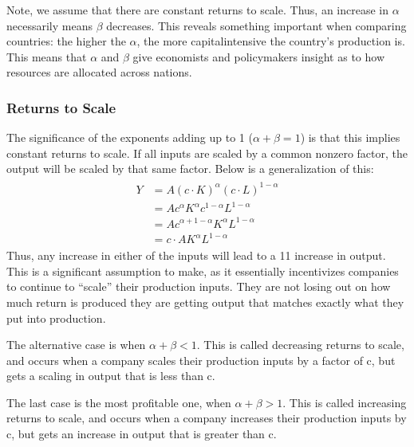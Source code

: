 \documentclass[letterpaper,10pt,english]{jupyterBook}
\begin{document}
\sphinxAtStartPar
Note, we assume that there are constant returns to scale. Thus, an increase in \(\alpha\) necessarily means \(\beta\) decreases. This reveals something important when comparing countries: the higher the \(\alpha\), the more capital\sphinxhyphen{}intensive the country’s production is. This means that \(\alpha\) and \(\beta\) give economists and policymakers insight as to how resources are allocated across nations.


\subsubsection{Returns to Scale}
\label{\detokenize{content/04-production/shifts:returns-to-scale}}
\sphinxAtStartPar
The significance of the exponents adding up to 1 (\(\alpha + \beta = 1\)) is that this implies constant returns to scale. If all inputs are scaled by a common non\sphinxhyphen{}zero factor, the output will be scaled by that same factor. Below is a generalization of this:
\begin{equation*}
\begin{split}\begin{aligned}
Y &= A (c \cdot K)^\alpha (c \cdot L)^{1 - \alpha} \\
&= A c^\alpha K ^ \alpha c^{1 - \alpha}L^{1 - \alpha} \\
&= A c^{\alpha + 1 - \alpha}K^\alpha L^{1 - \alpha} \\
&= c \cdot A K^\alpha L^{1 - \alpha}
\end{aligned}\end{split}
\end{equation*}
\sphinxAtStartPar
Thus, any increase in either of the inputs will lead to a 1\sphinxhyphen{}1 increase in output. This is a significant assumption to make, as it essentially incentivizes companies to continue to “scale” their production inputs. They are not losing out on how much return is produced \sphinxhyphen{} they are getting output that matches exactly what they put into production.

\sphinxAtStartPar
The alternative case is when \(\alpha + \beta < 1\). This is called decreasing returns to scale, and occurs when a company scales their production inputs by a factor of c, but gets a scaling in output that is less than c.

\sphinxAtStartPar
The last case is the most profitable one, when \(\alpha + \beta > 1\). This is called increasing returns to scale, and occurs when a company increases their production inputs by c, but gets an increase in output that is greater than c.
\end{document}
